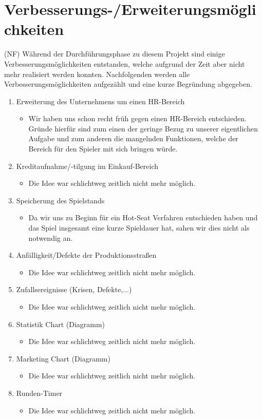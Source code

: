 \clearpage
\chapter{Verbesserungs-/Erweiterungsmöglichkeiten}
(NF) Während der Durchführungsphase zu diesem Projekt sind einige Verbesserungsmöglichkeiten entstanden, welche aufgrund der Zeit aber nicht mehr realisiert werden konnten. Nachfolgenden werden alle Verbesserungsmöglichkeiten aufgezählt und eine kurze Begründung abgegeben.
\begin{enumerate}
	\item Erweiterung des Unternehmens um einen HR-Bereich
\begin{itemize}
	\item Wir haben uns schon recht früh gegen einen HR-Bereich entschieden. Gründe hierfür sind zum einen der geringe Bezug zu unserer eigentlichen Aufgabe und zum anderen die mangelnden Funktionen, welche der Bereich für den Spieler mit sich bringen würde. 	
\end{itemize} 
	\item Kreditaufnahme/-tilgung im Einkauf-Bereich
\begin{itemize}
	\item Die Idee war schlichtweg zeitlich nicht mehr möglich.
\end{itemize} 
	\item Speicherung des Spielstands
\begin{itemize}
	\item Da wir uns zu Beginn für ein Hot-Seat Verfahren entschieden haben und das Spiel insgesamt eine kurze Spieldauer hat, sahen wir dies nicht als notwendig an.
\end{itemize} 
	\item Anfälligkeit/Defekte der Produktionsstraßen
\begin{itemize}
	\item Die Idee war schlichtweg zeitlich nicht mehr möglich.
\end{itemize} 
	\item Zufallsereignisse (Krisen, Defekte,...)
\begin{itemize}
	\item Die Idee war schlichtweg zeitlich nicht mehr möglich.
\end{itemize} 
	\item Statistik Chart (Diagramm) 
\begin{itemize}
	\item Die Idee war schlichtweg zeitlich nicht mehr möglich.
\end{itemize} 	
	\item Marketing Chart (Diagramm) 
\begin{itemize}
	\item Die Idee war schlichtweg zeitlich nicht mehr möglich.
\end{itemize}
	\item Runden-Timer
\begin{itemize}
	\item Die Idee war schlichtweg zeitlich nicht mehr möglich.
\end{itemize}
\end{enumerate}




